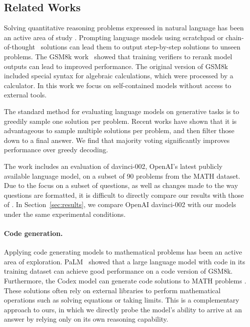 \subsection{Related Works}

Solving quantitative reasoning problems expressed in natural language has been an active area of study \citep{parsing_algebraic,learning_to_solve_arithmetic}. Prompting language models using scratchpad \cite{scratchpad} or chain-of-thought~\cite{chain_of_thought} solutions can lead them to output step-by-step  solutions to unseen problems. The GSM8k work~\cite{gsm8k} showed that training verifiers to rerank model outputs can lead to improved performance. The original version of GSM8k included special syntax for algebraic calculations, which were processed by a calculator. In this work we focus on self-contained models without access to external tools.

The standard method for evaluating language models on generative tasks is to greedily sample one solution per problem. Recent works \citep{codex,alphacode,lamda,majority_voting} have shown that it is advantageous to sample multiple solutions per problem, and then filter those down to a final answer. We find that majority voting \citep{majority_voting} significantly improves performance over greedy decoding. 

The work \cite{ocw_codex} includes an evaluation of davinci-002, OpenAI's latest publicly available language model, on a subset of 90 problems from the MATH dataset. Due to the focus on a subset of questions, as well as changes made to the way questions are formatted, it is difficult to directly compare our results with those of \cite{ocw_codex}. In Section~\ref{sec:results}, we compare OpenAI davinci-002 with our models under the same experimental conditions.

\paragraph{Code generation.} Applying code generating models to mathematical problems has been an active area of exploration. PaLM~\cite{palm} showed that a large language model with code in its training dataset can achieve good performance on a code version of GSM8k. Furthermore, the Codex model \citep{codex} can generate code solutions to MATH problems \cite{ocw_codex}. These solutions often rely on external libraries to perform mathematical operations such as solving equations or taking limits. This is a complementary approach to ours, in which we directly probe the model's ability to arrive at an answer by relying only on its own reasoning capability.

